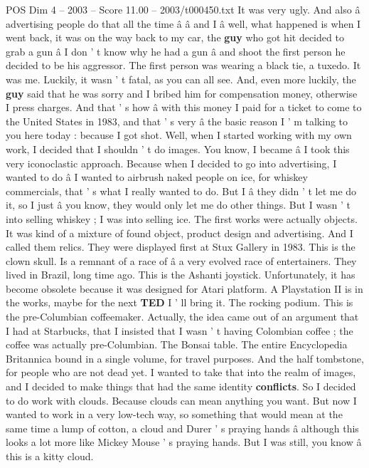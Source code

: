 \begin{textsample}{POS Dim 4 – 2003 – Score 11.00 – 2003/t000450.txt}
It was very ugly.
And also â advertising people do that all the time â â and I â well, what happened is when I went back, it was on the way back to my car, the \textbf{guy} who got hit decided to grab a gun â I don ' t know why he had a gun â and shoot the first person he decided to be his aggressor.
The first person was wearing a black tie, a tuxedo.
It was me.
Luckily, it wasn ' t fatal, as you can all see.
And, even more luckily, the \textbf{guy} said that he was sorry and I bribed him for compensation money, otherwise I press charges.
And that ' s how â with this money I paid for a ticket to come to the United States in 1983, and that ' s very â the basic reason I ' m talking to you here today : because I got shot.
Well, when I started working with my own work, I decided that I shouldn ' t do images.
You know, I became â I took this very iconoclastic approach.
Because when I decided to go into advertising, I wanted to do â I wanted to airbrush naked people on ice, for whiskey commercials, that ' s what I really wanted to do.
But I â they didn ' t let me do it, so I just â you know, they would only let me do other things.
But I wasn ' t into selling whiskey ; I was into selling ice.
The first works were actually objects.
It was kind of a mixture of found object, product design and advertising.
And I called them relics.
They were displayed first at Stux Gallery in 1983.
This is the clown skull.
Is a remnant of a race of â a very evolved race of entertainers.
They lived in Brazil, long time ago.
This is the Ashanti joystick.
Unfortunately, it has become obsolete because it was designed for Atari platform.
A Playstation II is in the works, maybe for the next \textbf{TED} I ' ll bring it.
The rocking podium.
This is the pre-Columbian coffeemaker.
Actually, the idea came out of an argument that I had at Starbucks, that I insisted that I wasn ' t having Colombian coffee ; the coffee was actually pre-Columbian.
The Bonsai table.
The entire Encyclopedia Britannica bound in a single volume, for travel purposes.
And the half tombstone, for people who are not dead yet.
I wanted to take that into the realm of images, and I decided to make things that had the same identity \textbf{conflicts}.
So I decided to do work with clouds.
Because clouds can mean anything you want.
But now I wanted to work in a very low-tech way, so something that would mean at the same time a lump of cotton, a cloud and Durer ' s praying hands â although this looks a lot more like Mickey Mouse ' s praying hands.
But I was still, you know â this is a kitty cloud.

\end{textsample}
